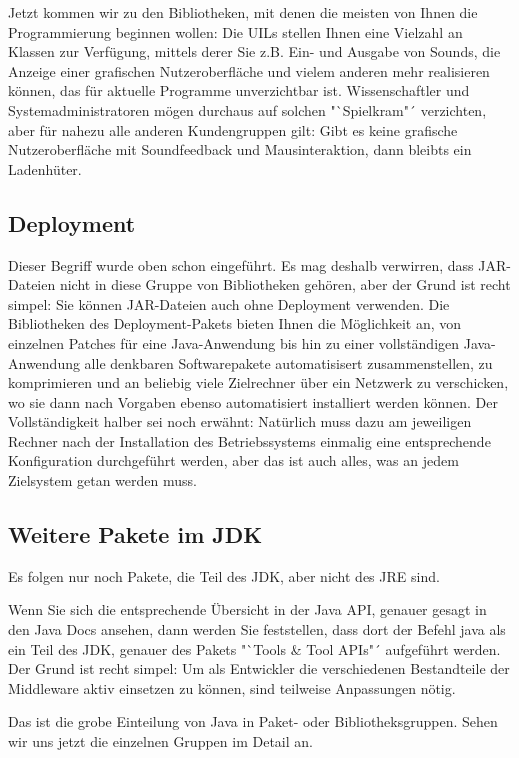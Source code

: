 Jetzt kommen wir zu den Bibliotheken, mit denen die meisten von Ihnen die Programmierung beginnen wollen: Die UILs stellen Ihnen eine Vielzahl an Klassen zur Verfügung, mittels derer Sie z.B. Ein- und Ausgabe von Sounds, die Anzeige einer grafischen Nutzeroberfläche und vielem anderen mehr realisieren können, das für aktuelle Programme unverzichtbar ist. Wissenschaftler und Systemadministratoren mögen durchaus auf solchen "`Spielkram"´ verzichten, aber für nahezu alle anderen Kundengruppen gilt: Gibt es keine grafische Nutzeroberfläche mit Soundfeedback und Mausinteraktion, dann bleibts ein Ladenhüter.

\subsection{Deployment}

Dieser Begriff wurde oben schon eingeführt. Es mag deshalb verwirren, dass JAR-Dateien nicht in diese Gruppe von Bibliotheken gehören, aber der Grund ist recht simpel: Sie können JAR-Dateien auch ohne Deployment verwenden. Die Bibliotheken des Deployment-Pakets bieten Ihnen die Möglichkeit an, von einzelnen Patches für eine Java-Anwendung bis hin zu einer vollständigen Java-Anwendung alle denkbaren Softwarepakete automatisisert zusammenstellen, zu komprimieren und an beliebig viele Zielrechner über ein Netzwerk zu verschicken, wo sie dann nach Vorgaben ebenso automatisiert installiert werden können. Der Vollständigkeit halber sei noch erwähnt: Natürlich muss dazu am jeweiligen Rechner nach der Installation des Betriebssystems einmalig eine entsprechende Konfiguration durchgeführt werden, aber das ist auch alles, was an jedem Zielsystem getan werden muss.

\subsection{Weitere Pakete im JDK}

Es folgen nur noch Pakete, die Teil des JDK, aber nicht des JRE sind.

Wenn Sie sich die entsprechende Übersicht in der Java API, genauer gesagt in den Java Docs ansehen, dann werden Sie feststellen, dass dort der Befehl java als ein Teil des JDK, genauer des Pakets "`Tools \& Tool APIs"´ aufgeführt werden. Der Grund ist recht simpel: Um als Entwickler die verschiedenen Bestandteile der Middleware aktiv einsetzen zu können, sind teilweise Anpassungen nötig.

Das ist die grobe Einteilung von Java in Paket- oder Bibliotheksgruppen. Sehen wir uns jetzt die einzelnen Gruppen im Detail an.

